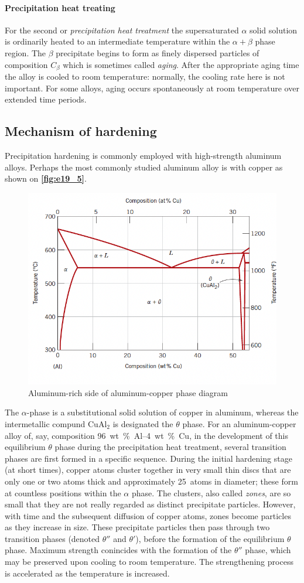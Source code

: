 \paragraph{Precipitation heat treating} For the second or \textit{precipitation heat treatment} the supersaturated $\alpha$ solid solution is ordinarily heated to an intermediate temperature within the $\alpha + \beta$ phase region. The $\beta$ precipitate begins to form as finely dispersed particles of composition $C_{\beta}$ which is sometimes called \textit{aging}. After the appropriate aging time the alloy is cooled to room temperature: normally, the cooling rate here is not important. For some alloys, aging occurs spontaneously at room temperature over extended time periods. 

\subsection{Mechanism of hardening}
Precipitation hardening is commonly employed with high-strength aluminum alloys. Perhaps the most commonly studied aluminum alloy is with copper as shown on \textbf{\autoref{fig:e19_5}}.
\begin{figure} [ht]
  \centering
  \includegraphics[width=0.5\linewidth]{./figures/e19_5.png}
  \caption{Aluminum-rich side of aluminum-copper phase diagram}
  \label{fig:e19_5}
\end{figure}

The $\alpha$-phase is a substitutional solid solution of copper in aluminum, whereas the intermetallic compund $\mathrm{CuAl}_2$ is designated the $\theta$ phase. For an aluminum-copper alloy of, say, composition \qty{96}{wt\% Al}--\qty{4}{wt\% Cu}, in the development of this equilibrium $\theta$ phase during the precipitation heat treatment, several transition phases are first formed in a specific sequence. During the initial hardening stage (at short times), copper atoms cluster together in very small thin discs that are only one or two atoms thick and approximately \qty{25}{atoms} in diameter; these form at countless positions within the $\alpha$ phase. The clusters, also called \textit{zones}, are so small that they are not really regarded as distinct precipitate particles. However, with time and the subsequent diffusion of copper atoms, zones become particles as they increase in size. These precipitate particles then pass through two transition phases (denoted $\theta''$ and $\theta'$), before the formation of the equilibrium $\theta$ phase. Maximum strength conincides with the formation of the $\theta''$ phase, which may be preserved upon cooling to room temperature. The strengthening process is accelerated as the temperature is increased. 
